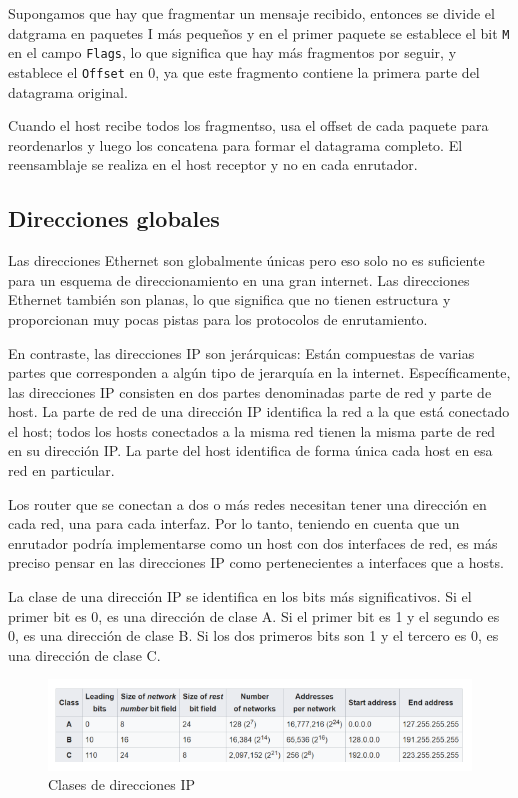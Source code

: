 Supongamos que hay que fragmentar un mensaje recibido, entonces se divide el datgrama en paquetes I más pequeños y en el primer paquete se establece el bit \texttt{M} en el campo \texttt{Flags}, lo que significa que hay más fragmentos por seguir, y establece el \texttt{Offset} en 0, ya que este fragmento contiene la primera parte del datagrama original.

Cuando el host recibe todos los fragmentso, usa el offset de cada paquete para reordenarlos y luego los concatena para formar el datagrama completo. El reensamblaje se realiza en el host receptor y no en cada enrutador.

\subsection{Direcciones globales}
Las direcciones Ethernet son globalmente únicas pero eso solo no es suficiente para un esquema de direccionamiento en una gran internet. Las direcciones Ethernet también son planas, lo que significa que no tienen estructura y proporcionan muy pocas pistas para los protocolos de enrutamiento.

En contraste, las direcciones IP son jerárquicas: Están compuestas de varias partes que corresponden a algún tipo de jerarquía en la internet. Específicamente, las direcciones IP consisten en dos partes denominadas parte de red y parte de host. La parte de red de una dirección IP identifica la red a la que está conectado el host;  todos los hosts conectados a la misma red tienen la misma parte de red en su dirección IP. La parte del host identifica de forma única cada host en esa red en particular.

Los router   que se conectan a dos o más redes necesitan tener una dirección en cada red, una para cada interfaz. Por lo tanto, teniendo en cuenta que un enrutador podría implementarse como un host con dos interfaces de red, es más preciso pensar en las direcciones IP como pertenecientes a interfaces que a hosts.

La clase de una dirección IP se identifica en los bits más significativos. Si el primer bit es 0, es una dirección de clase A. Si el primer bit es 1 y el segundo es 0, es una dirección de clase B. Si los dos primeros bits son 1 y el tercero es 0, es una dirección de clase C. 

\begin{figure}[H]
	\centering
	\includegraphics[width=\textwidth
]{images/ip-address-classes.png}
	\caption[Clases de direcciones IP]{Clases de direcciones IP}
	\label{fig:ip-address-classes}
\end{figure}


